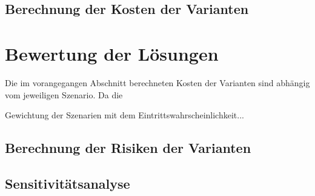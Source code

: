 	


	\subsection{Berechnung der Kosten der Varianten}
	\label{subsec:Kostenberechnung}
	


\section{Bewertung der Lösungen}
\label{sec:Bewertung}

Die im vorangegangen Abschnitt berechneten Kosten der Varianten sind abhängig vom jeweiligen Szenario. Da die 

Gewichtung der Szenarien mit dem Eintrittswahrscheinlichkeit...

	\subsection{Berechnung der Risiken der Varianten}
	



	\subsection{Sensitivitätsanalyse}
	

%

